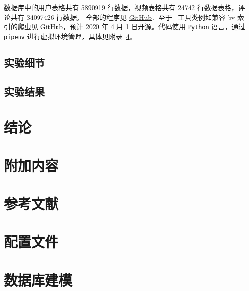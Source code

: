 数据库中的用户表格共有 5890919 行数据，视频表格共有 24742 行数据表格，评论共有 34097426 行数据。
全部的程序见 \href{https://github.com/Iydon/homework/tree/master/CS307}{GitHub}，至于 \bilibili\ 工具类例如兼容 bv 索引的爬虫见 \href{https://github.com/iydon/bilibili}{GitHub}，预计 2020 年 4 月 1 日开源。代码使用 \texttt{Python} 语言，通过 \texttt{pipenv} 进行虚拟环境管理，具体见附录~\ref{A:config}。


\subsection{实验细节}
\lipsum[3]


\subsection{实验结果}
\lipsum[4]



\section{结论}
\lipsum[5]



\section{附加内容}
\lipsum[6]



\clearpage
\section{参考文献}
\nocite{*}
\printbibliography[heading=none]



\clearpage
\begin{appendices}
    \section{配置文件}\label{A:config}
    \section{数据库建模}\label{A:database}
\end{appendices}
